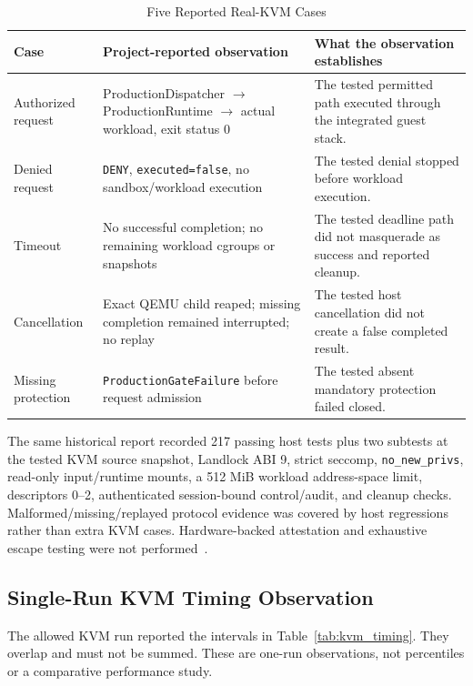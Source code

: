 \documentclass[journal]{IEEEtran}
\begin{document}
\begin{table}[!t]
\caption{Five Reported Real-KVM Cases}
\label{tab:kvm_cases}
\centering
\small
\begin{tabularx}{\textwidth}{lYY}
\toprule
\textbf{Case} & \textbf{Project-reported observation} & \textbf{What the observation establishes} \\
\midrule
Authorized request & ProductionDispatcher $\rightarrow$ ProductionRuntime $\rightarrow$ actual workload, exit status 0 & The tested permitted path executed through the integrated guest stack. \\
Denied request & \texttt{DENY}, \texttt{executed=false}, no sandbox/workload execution & The tested denial stopped before workload execution. \\
Timeout & No successful completion; no remaining workload cgroups or snapshots & The tested deadline path did not masquerade as success and reported cleanup. \\
Cancellation & Exact QEMU child reaped; missing completion remained interrupted; no replay & The tested host cancellation did not create a false completed result. \\
Missing protection & \texttt{ProductionGateFailure} before request admission & The tested absent mandatory protection failed closed. \\
\bottomrule
\end{tabularx}
\end{table}

The same historical report recorded 217 passing host tests plus two subtests at the tested KVM source snapshot, Landlock ABI 9, strict seccomp, \texttt{no\_new\_privs}, read-only input/runtime mounts, a 512 MiB workload address-space limit, descriptors 0--2, authenticated session-bound control/audit, and cleanup checks. Malformed/missing/replayed protocol evidence was covered by host regressions rather than extra KVM cases. Hardware-backed attestation and exhaustive escape testing were not performed~\cite{BULL_MicroVMReport}.

\subsection{Single-Run KVM Timing Observation}
The allowed KVM run reported the intervals in Table~\ref{tab:kvm_timing}. They overlap and must not be summed. These are one-run observations, not percentiles or a comparative performance study.
\end{document}
